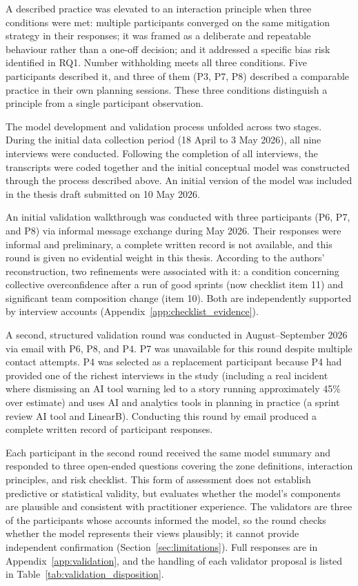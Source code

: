 \documentclass[a4paper,twoside]{bth}
\begin{document}
A described practice was elevated to an interaction principle when three conditions were met: multiple participants converged on the same mitigation strategy in their responses; it was framed as a deliberate and repeatable behaviour rather than a one-off decision; and it addressed a specific bias risk identified in RQ1. Number withholding meets all three conditions. Five participants described it, and three of them (P3, P7, P8) described a comparable practice in their own planning sessions. These three conditions distinguish a principle from a single participant observation.

The model development and validation process unfolded across two stages. During the initial data collection period (18 April to 3 May 2026), all nine interviews were conducted. Following the completion of all interviews, the transcripts were coded together and the initial conceptual model was constructed through the process described above. An initial version of the model was included in the thesis draft submitted on 10 May 2026.

An initial validation walkthrough was conducted with three participants (P6, P7, and P8) via informal message exchange during May 2026. Their responses were informal and preliminary, a complete written record is not available, and this round is given no evidential weight in this thesis. According to the authors' reconstruction, two refinements were associated with it: a condition concerning collective overconfidence after a run of good sprints (now checklist item 11) and significant team composition change (item 10). Both are independently supported by interview accounts (Appendix~\ref{app:checklist_evidence}).

A second, structured validation round was conducted in August--September 2026 via email with P6, P8, and P4. P7 was unavailable for this round despite multiple contact attempts. P4 was selected as a replacement participant because P4 had provided one of the richest interviews in the study (including a real incident where dismissing an AI tool warning led to a story running approximately 45\% over estimate) and uses AI and analytics tools in planning in practice (a sprint review AI tool and LinearB). Conducting this round by email produced a complete written record of participant responses.

Each participant in the second round received the same model summary and responded to three open-ended questions covering the zone definitions, interaction principles, and risk checklist. This form of assessment does not establish predictive or statistical validity, but evaluates whether the model's components are plausible and consistent with practitioner experience. The validators are three of the participants whose accounts informed the model, so the round checks whether the model represents their views plausibly; it cannot provide independent confirmation (Section~\ref{sec:limitations}). Full responses are in Appendix~\ref{app:validation}, and the handling of each validator proposal is listed in Table~\ref{tab:validation_disposition}.
\end{document}
